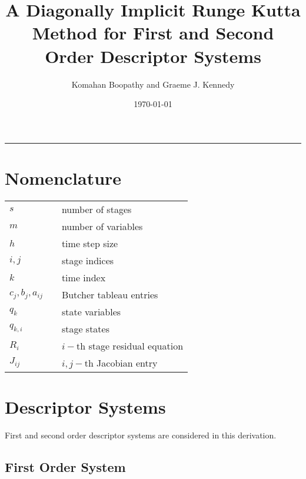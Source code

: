 \documentclass[pdftex,11pt,letter]{article}
\title{\textbf{A Diagonally Implicit Runge Kutta Method for First and Second Order Descriptor Systems}}
\author{{Komahan Boopathy} {and} {Graeme J. Kennedy}} \date{\today}
\begin{document}
\maketitle
\vspace{-0.25in}
\rule{\linewidth}{2pt}

\begin{multicols}{2}


\section*{Nomenclature}
\begin{minipage}[b]{0.5\linewidth}\centering
\begin{tabular}{@{}lcl@{}}
$s$   && number of stages\\
$m$   && number of variables\\
$h$   && time step size \\
$i,j$ && stage indices \\
$k$   && time index \\
$c_j,b_j,a_{ij}$ && Butcher tableau entries \\
$q_k$ && state variables\\
$q_{k,i}$ && stage states \\
$R_i$  && $i-$th stage residual equation \\
$J_{ij}$  && $i,j-$th Jacobian entry \\
\end{tabular}
\end{minipage}


\section{Descriptor Systems}

First and second order descriptor systems are considered in this
derivation.

\subsection{First Order System}


\end{multicols}
\end{document}
